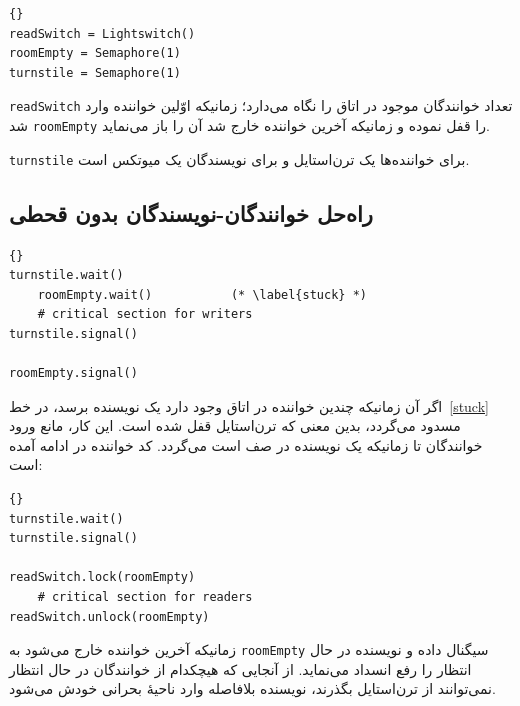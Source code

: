 \documentclass{book}
\newcommand{\clearemptydoublepage}{\newpage\cleardoublepage}
\begin{document}
\begin{latin}
\begin{lstlisting}[title=\rl{مقدار دهی اولیه خوانندگان-نویسندگان بدون قحطی}]{}
readSwitch = Lightswitch()
roomEmpty = Semaphore(1)
turnstile = Semaphore(1)
\end{lstlisting}
\end{latin}

    {\tt readSwitch} 
    تعداد خوانندگان موجود در اتاق را نگاه می‌دارد؛ زمانیکه اوّلین خواننده وارد شد  {\tt roomEmpty} را قفل نموده و زمانیکه آخرین خواننده خارج شد 
    آن را باز می‌نماید. 

    {\tt turnstile}
    برای خواننده‌ها یک ترن‌استایل  و برای نویسندگان یک میوتکس است. 


\clearemptydoublepage
\subsection{راه‌حل خوانندگان-نویسندگان بدون قحطی}  


\begin{latin}
\begin{lstlisting}[title=\rl{راه‌حل نویسنده بدون قحطی}]{}
turnstile.wait()
    roomEmpty.wait()           (* \label{stuck} *)
    # critical section for writers
turnstile.signal()

roomEmpty.signal()
\end{lstlisting}
\end{latin}

    اگر آن زمانیکه چندین خواننده در اتاق وجود دارد یک نویسنده برسد، در خط~\ref{stuck} مسدود می‌گردد، بدین معنی که ترن‌استایل قفل شده است. 
    این کار، مانع ورود خوانندگان تا زمانیکه یک نویسنده در صف است می‌گردد. کد خواننده در ادامه آمده است: 

\begin{latin}
\begin{lstlisting}[title=\rl{راه‌حل خواننده بدون قحطی}]{}
turnstile.wait()
turnstile.signal()

readSwitch.lock(roomEmpty)
    # critical section for readers
readSwitch.unlock(roomEmpty)
\end{lstlisting}
\end{latin}

    زمانیکه آخرین خواننده خارج می‌شود به {\tt roomEmpty} سیگنال داده و نویسنده در حال انتظار را رفع انسداد می‌نماید. 
    از آنجایی که هیچکدام از خوانندگان در حال انتظار نمی‌توانند از ترن‌استایل بگذرند، نویسنده بلافاصله وارد ناحیهٔ بحرانی خودش می‌شود. 
\end{document}
